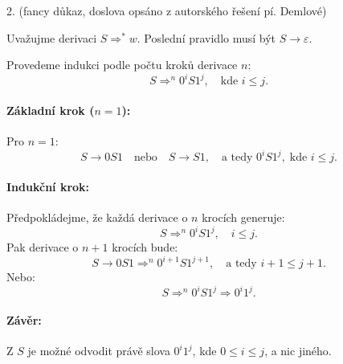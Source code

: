 2. (fancy důkaz, doslova opsáno z autorského řešení pí. Demlové)

Uvažujme derivaci \( S \Rightarrow^* w \). Poslední pravidlo musí být \( S \rightarrow \varepsilon \).

Provedeme indukci podle počtu kroků derivace \( n \):
\[
S \Rightarrow^n 0^i S 1^j, \quad \text{kde } i \leq j.
\]

\paragraph{Základní krok (\(n = 1\)):}
Pro \(n = 1\):
\[
S \rightarrow 0 S 1 \quad \text{nebo} \quad S \rightarrow S 1, \quad \text{a tedy } 0^i S 1^j, \; \text{kde } i \leq j.
\]

\paragraph{Indukční krok:}
Předpokládejme, že každá derivace o \(n\) krocích generuje:
\[
S \Rightarrow^n 0^i S 1^j, \quad i \leq j.
\]
Pak derivace o \(n+1\) krocích bude:
\[
S \rightarrow 0 S 1 \Rightarrow^n 0^{i+1} S 1^{j+1}, \quad \text{a tedy } i+1 \leq j+1.
\]
Nebo:
\[
S \Rightarrow^n 0^i S 1^j \Rightarrow 0^i 1^j.
\]

\paragraph{Závěr:}
Z \(S\) je možné odvodit právě slova \(0^i 1^j\), kde \(0 \leq i \leq j\), a nic jiného.